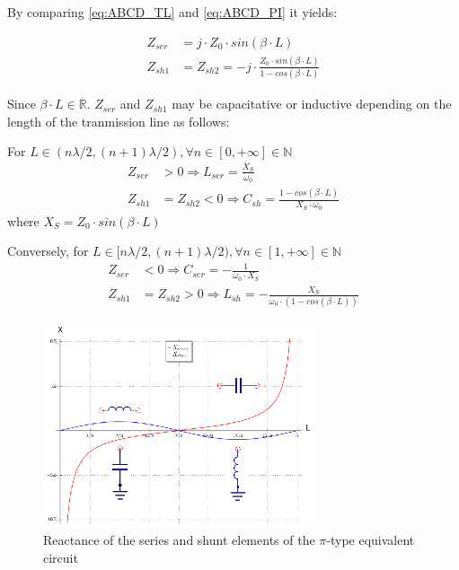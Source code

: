 \noindent By comparing \ref{eq:ABCD_TL} and \ref{eq:ABCD_PI} it yields:

\begin{align}
     Z_{ser} &= j \cdot Z_0 \cdot sin(\beta \cdot L) \\
     Z_{sh1} &= Z_{sh2} = -j \cdot \frac{Z_0 \cdot sin(\beta \cdot L)}{1 - cos(\beta \cdot L)}
\end{align}

\noindent Since $\beta \cdot L \in \mathbb{R}$. $Z_{ser}$ and $Z_{sh1}$ may be capacitative or inductive depending on the length of the tranmission line as follows:

\noindent For $L \in (n\lambda/2, (n+1) \lambda/2), \forall n  \in [0, +\infty] \in \mathbb{N}$
\begin{align}
     Z_{ser} &> 0 \Longrightarrow L_{ser} = \frac{X_S}{\omega_0} \\
     Z_{sh1} &= Z_{sh2}  < 0 \Longrightarrow C_{sh} = \frac{1 - cos(\beta \cdot L)}{X_S\cdot \omega_0}
\end{align}
\noindent where $X_S = Z_0 \cdot sin(\beta \cdot L)$

\noindent Conversely, for $L \in [n\lambda/2, (n+1) \lambda/2), \forall n  \in [1, +\infty] \in \mathbb{N}$
\begin{align}
     Z_{ser} &< 0 \Longrightarrow C_{ser} = -\frac{1}{\omega_0 \cdot X_S} \\
     Z_{sh1} &= Z_{sh2} > 0  \Longrightarrow L_{sh} = -\frac{X_S}{\omega_0 \cdot (1 - cos(\beta \cdot L))}
\end{align}

\begin{figure}[H]
\centering
\includegraphics[width=80mm]{pi-to-tee-equivalent-implementation}
\caption{Reactance of the series and shunt elements of the $\pi$-type equivalent circuit}
\label{fig:Transmission-Line-Circuit-Equivalent-Values}
\end{figure}

